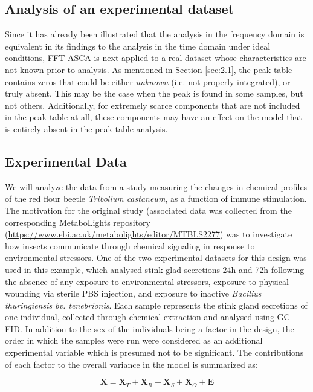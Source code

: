 \documentclass[preprint,12pt]{elsarticle}
\begin{document}
\subsection{Analysis of an experimental dataset}

Since it has already been illustrated that the analysis in the frequency domain is equivalent in its findings to the analysis in the time domain under ideal conditions, FFT-ASCA is next applied to a real dataset whose characteristics are not known prior to analysis. As mentioned in Section \ref{sec:2.1}, the peak table contains zeros that could be either \textit{unknown} (i.e. not properly integrated), or truly absent. This may be the case when the peak is found in some samples, but not others. Additionally, for extremely scarce components that are not included in the peak table at all, these components may have an effect on the model that is entirely absent in the peak table analysis.  

\subsection{Experimental Data}
We will analyze the data from a study measuring the changes in chemical profiles of the red flour beetle \textit{Tribolium castaneum}, as a function of immune stimulation. The motivation for the original study \cite{lo2023immune} (associated data was collected from the corresponding MetaboLights repository (\url{https://www.ebi.ac.uk/metabolights/editor/MTBLS2277}) was to investigate how insects communicate through chemical signaling in response to environmental stressors. One of the two experimental datasets for this design was used in this example, which analysed stink glad secretions 24h and 72h following the absence of any exposure to environmental stressors, exposure to physical wounding via sterile PBS injection, and exposure to inactive \textit{Bacilius thuringiensis bv. tenebrionis}. Each sample represents the stink gland secretions of one individual, collected through chemical extraction and analysed using GC-FID. In addition to the sex of the individuals being a factor in the design, the order in which the samples were run were considered as an additional experimental variable which is presumed not to be significant. The contributions of each factor to the overall variance in the model is summarized as:

\begin{equation}\label{eq:GLM}
    \mathbf{X} = \mathbf{X}_T + \mathbf{X}_R + \mathbf{X}_S + \mathbf{X}_O + \mathbf{E}
\end{equation}
\end{document}
